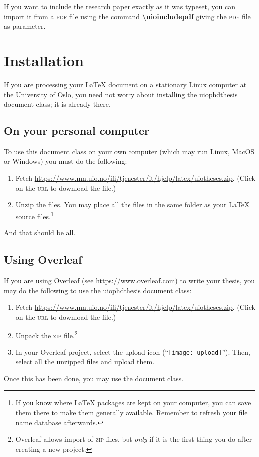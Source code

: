 \documentclass[UKenglish]{uiophdthesis}
\newcommand{\bsl}{\textbackslash}
\newcommand{\p}[1]{\textsf{#1}}
\newcommand{\pcmd}[1]{\p{\bsl #1}}
\begin{document}
If you want to include the research paper exactly as it was typeset,
you can import it from a \textsc{pdf} file using the command
\textbf{\pcmd{uioincludepdf}} giving the \textsc{pdf} file as
parameter. 

\chapter{Installation}
If you are processing your \LaTeX{} document on a stationary Linux
computer at the University of Oslo, you need not worry about
installing the \p{uiophdthesis} document class; it is already there.

\section{On your personal computer\label{privat-pc}}
To use this document class on your own computer (which may run Linux, MacOS
or Windows) you must do the following:
\begin{enumerate}
\item Fetch
  \url{https://www.mn.uio.no/ifi/tjenester/it/hjelp/latex/uiotheses.zip}. (Click
  on the \textsc{url} to download the file.)
  
\item Unzip the files. You may place all the files in the same folder
  as your \LaTeX{} source files.\footnote{If you know where \LaTeX{}
    packages are kept on your computer, you 
    can save them there to make them generally available. Remember to
    refresh your file name database afterwards.}
\end{enumerate}
And that should be all.

\section{Using Overleaf}
If you are using Overleaf (see \url{https://www.overleaf.com}) to
write your thesis, you may do the following to use the \p{uiophdthesis}
document class:
\begin{enumerate}
\item Fetch 
  \url{https://www.mn.uio.no/ifi/tjenester/it/hjelp/latex/uiotheses.zip}. (Click
  on the \textsc{url} to download the file.)

\item Unpack the \textsc{zip} file.\footnote{Overleaf allows import of
  \textsc{zip} files, but \emph{only} if it is the first thing you do
  after creating a new project.}

\item In your Overleaf project, select the upload icon
  (``\texttt{[image: upload]}''). Then, select all the
  unzipped files and upload them.
\end{enumerate}
Once this has been done, you may use the document class.
\end{document}
